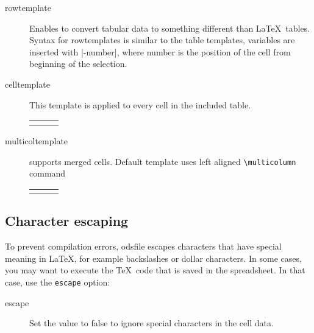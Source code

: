 \documentclass{ltxdoc}
\begin{document}
\begin{description}
\item[rowtemplate] 
\makeatletter
\edef\@currentlabel{rowtemplate}
\label{it:rowtemplate} Enables to convert tabular data to something different than \LaTeX\ tables. 
Syntax for rowtemplates is similar to the table templates, variables are inserted with |-{number}|, where 
number is the position of the cell from beginning of the selection. 
\makeatother
\begin{LTXexample}
\end{LTXexample}

\item[celltemplate] This template is applied to every cell in the included table.
  \begin{LTXexample}
    \begin{tabular}{lll}
    \end{tabular}
  \end{LTXexample}

\item[multicoltemplate] 
supports merged cells. Default template uses left aligned \verb|\multicolumn|
command
\begin{LTXexample}
  \begin{tabular}{lll}
  \end{tabular}
\end{LTXexample}

\end{description} 

\subsection{Character escaping}

To prevent compilation errors, \textsf{odsfile} escapes characters that have special meaning in \LaTeX, 
for example backslashes or dollar characters. In some cases, you may want to
execute the \TeX\ code that is saved in the spreadsheet. In that case, use the \texttt{escape} option:

\begin{description}

\item[escape] Set the value to false to ignore special characters in the cell data.
\end{description}
\end{document}
